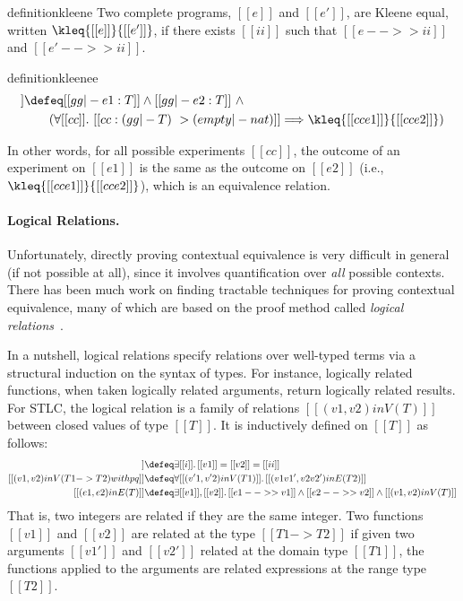 \begin{restatable}{definition}{kleene}
  Two complete programs, $[[e]]$ and $[[e']]$, are Kleene equal, written
  $\kleq{[[e]]}{[[e']]}$, if there exists $[[ii]]$ such that $[[e -->> ii]]$ and $[[e' -->> ii]]$.
\end{restatable}


\begin{restatable}{definition}{kleenee}  \label{def:cxtx}%
  \begin{align*}
    [[gg |- e1 ~= e2 : T]]  & \defeq [[gg |- e1 : T]] \land [[gg |- e2 : T]] \ \land \\
                                 & \qquad (\forall [[cc]].\ [[cc : (gg |- T) ~> (empty |- nat)]]  \Longrightarrow \kleq{[[cc{e1}]]}{[[cc{e2}]]})
  \end{align*}
\end{restatable}

In other words, for all possible experiments $[[ cc ]]$, the outcome of an
experiment on $[[e1]]$ is the same as the outcome on $[[e2]]$
(i.e., $\kleq{[[cc{e1}]]}{[[cc{e2}]]}$), which is an equivalence relation.


\paragraph{Logical Relations.}

Unfortunately, directly proving contextual equivalence is very difficult in
general (if not possible at all), since it involves quantification over
\textit{all} possible contexts. There has been much work on finding tractable
techniques for proving contextual equivalence, many of which are based on the
proof method called \emph{logical relations}~\citep{tait, plotkin1973lambda, statman1985logical}.

In a nutshell, logical relations specify relations over well-typed terms via a
structural induction on the syntax of types. For instance, logically related
functions, when taken logically related arguments, return logically related
results. For STLC, the logical relation is a family of relations $[[ (v1, v2) in V(T)  ]]$
between closed values of type $[[T]]$. It is inductively defined on $[[T]]$ as follows:
\begin{align*}
  [[(v1 , v2) in V ( nat ) with pq ]]  &\defeq  \exists [[i]].\, [[v1]] = [[v2]] = [[ii]] \\
  [[(v1 , v2) in V ( T1 -> T2 ) with pq ]]  & \defeq  \forall [[(v'1, v'2) in V (T1)  ]].\, [[  (v1 v1' , v2 v2') in E (T2)  ]] \\
  [[(e1, e2) in E (T)  ]] & \defeq \exists [[v1]], [[v2]].\, [[e1 -->> v1]] \land [[e2 -->> v2]] \land [[(v1, v2) in V (T) ]]
\end{align*}
That is, two integers are related if they are the same integer. Two functions
$[[v1]]$ and $[[v2]]$ are related at the type $[[T1 -> T2]]$ if given two
arguments $[[v1']]$ and $[[v2']]$ related at the domain type $[[T1]]$, the
functions applied to the arguments are related expressions at the range type
$[[T2]]$.


